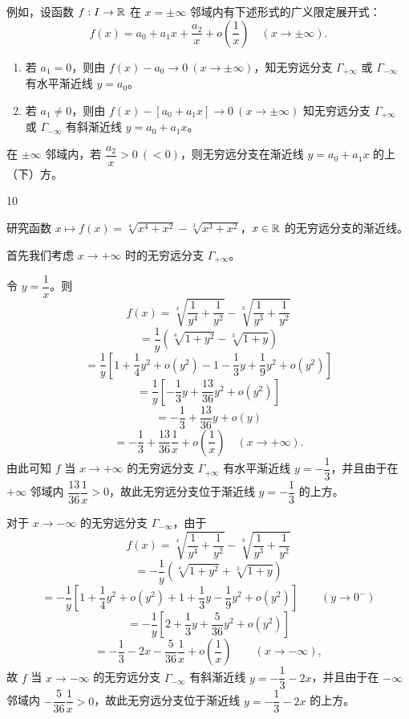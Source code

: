 例如，设函数 $f:I\to\mathbb{R}$ 在 $x=\pm\infty$ 邻域内有下述形式的广义限定展开式：
\[f(x)=a_0+a_1x+\frac{a_2}{x}+o\left(\frac1x\right)\quad(x\to\pm\infty).\]
\begin{enumerate}[label=\arabic{enumi})]
\item 若 $a_1=0$，则由 $f(x)-a_0\to0\ (x\to\pm\infty)$，知无穷远分支 $\Gamma_{+\infty}$ 或 $\Gamma_{-\infty}$ 有水平渐近线 $y=a_0$。
\item 若 $a_1\neq0$，则由 $f(x)-[a_0+a_1x]\to0\ (x\to\pm\infty)$ 知无穷远分支 $\Gamma_{+\infty}$ 或 $\Gamma_{-\infty}$ 有斜渐近线 $y=a_0+a_1x$。
\end{enumerate}
在 $\pm\infty$ 邻域内，若 $\dfrac{a_2}{x}>0\ (<0)$，则无穷远分支在渐近线 $y=a_0+a_1x$ 的上（下）方。

\begin{sourceexample}{10}

研究函数 $x\longmapsto f(x)=\sqrt[4]{x^4+x^2}-\sqrt[3]{x^3+x^2}$，$x\in\mathbb{R}$ 的无穷远分支的渐近线。

首先我们考虑 $x\to+\infty$ 时的无穷远分支 $\Gamma_{+\infty}$。

令 $y=\dfrac1x$。则
\[f(x)=\sqrt[4]{\frac{1}{y^4}+\frac{1}{y^2}}-\sqrt[3]{\frac{1}{y^3}+\frac{1}{y^2}}\]
\[=\frac{1}{y}\left(\sqrt[4]{1+y^2}-\sqrt[3]{1+y}\right)\]
\[=\frac{1}{y}\left[1+\frac{1}{4}y^2+o(y^2)-1-\frac{1}{3}y+\frac{1}{9}y^2+o(y^2)\right]\]
\[=\frac{1}{y}\left[-\frac{1}{3}y+\frac{13}{36}y^2+o(y^2)\right]\]
\[=-\frac{1}{3}+\frac{13}{36}y+o(y)\]
\[=-\frac{1}{3}+\frac{13}{36}\frac{1}{x}+o\left(\frac{1}{x}\right)\quad(x\to+\infty).\]
由此可知 $f$ 当 $x\to+\infty$ 的无穷远分支 $\Gamma_{+\infty}$ 有水平渐近线 $y=-\dfrac13$，并且由于在 $+\infty$ 邻域内 $\dfrac{13}{36}\dfrac1x>0$，故此无穷远分支位于渐近线 $y=-\dfrac13$ 的上方。

对于 $x\to-\infty$ 的无穷远分支 $\Gamma_{-\infty}$，由于
\[f(x)=\sqrt[4]{\frac{1}{y^4}+\frac{1}{y^2}}-\sqrt[3]{\frac{1}{y^3}+\frac{1}{y^2}}\]
\[=-\frac{1}{y}\left(\sqrt[4]{1+y^2}+\sqrt[3]{1+y}\right)\]
\[=-\frac{1}{y}\left[1+\frac{1}{4}y^2+o(y^2)+1+\frac{1}{3}y-\frac{1}{9}y^2+o(y^2)\right]\qquad(y\to0^-)\]
\[=-\frac{1}{y}\left[2+\frac{1}{3}y+\frac{5}{36}y^2+o(y^2)\right]\]
\[=-\frac{1}{3}-2x-\frac{5}{36}\frac{1}{x}+o\left(\frac{1}{x}\right)\qquad(x\to-\infty),\]
故 $f$ 当 $x\to-\infty$ 的无穷远分支 $\Gamma_{-\infty}$ 有斜渐近线 $y=-\dfrac13-2x$，并且由于在 $-\infty$ 邻域内 $-\dfrac{5}{36}\dfrac1x>0$，故此无穷远分支位于渐近线 $y=-\dfrac13-2x$ 的上方。

\end{sourceexample}

